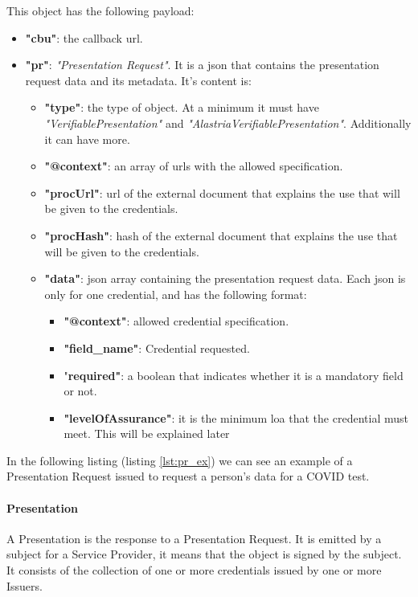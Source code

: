 This object has the following payload:
\begin{itemize}
    \item \textbf{"cbu"}: the callback \acrshort{url}.
    \item \textbf{"pr"}: \textit{"Presentation Request"}. It is a \acrshort{json} that contains the presentation request data and its metadata. It's content is:
          \begin{itemize}
              \item \textbf{"type"}: the type of object. At a minimum it must have \textit{"VerifiablePresentation"} and \textit{"AlastriaVerifiablePresentation"}. Additionally it can have more.
              \item \textbf{"@context"}: an array of \acrshort{url}s with the allowed specification.
              \item \textbf{"procUrl"}: \acrshort{url} of the external document that explains the use that will be given to the credentials.
              \item \textbf{"procHash"}: hash of the external document that explains the use that will be given to the credentials.
              \item \textbf{"data"}: \acrshort{json} array containing the presentation request data. Each \acrshort{json} is only for one credential, and has the following format:
                    \begin{itemize}
                        \item \textbf{"@context"}: allowed credential specification.
                        \item \textbf{"field\_name"}: Credential requested.
                        \item "\textbf{required"}: a boolean that indicates whether it is a mandatory field or not.
                        \item \textbf{"levelOfAssurance"}: it is the minimum \acrfull{loa} that the credential must meet. This will be explained later
                    \end{itemize}
          \end{itemize}
\end{itemize}
In the following listing (listing \ref{lst:pr_ex}) we can see an example of a Presentation Request issued to request a person's data for a COVID test.


\paragraph{Presentation}
A Presentation is the response to a Presentation Request. It is emitted by a subject for a Service Provider, it means that the object is signed by the subject. It consists of the collection of one or more credentials issued by one or more Issuers.

